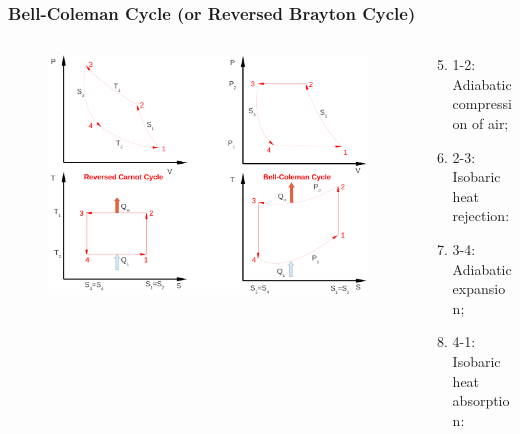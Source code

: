 \documentclass[10pt,compress]{beamer}
\begin{document}
\begin{frame}
 \frametitle{Bell-Coleman Cycle (or Reversed Brayton Cycle)}
  \begin{columns}

   \begin{column}[c]{0.6\linewidth}
    \begin{figure}%
     \begin{center}
      \includegraphics[width=\columnwidth]{./Pics/Overview_Refrig7}
     \end{center}
    \end{figure}  
   \end{column}  

   \begin{column}[c]{0.4\linewidth} 
      \begin{enumerate}[(1)]\setcounter{enumi}{4}\scriptsize
         \item <2-> 1-2: Adiabatic compression of air;
         \item <3-> 2-3: Isobaric heat rejection:
         \item <4-> 3-4: Adiabatic expansion;
         \item <5-> 4-1: Isobaric heat absorption:
      \end{enumerate}
   \end{column}
  \end{columns}

\end{frame}
\end{document}
